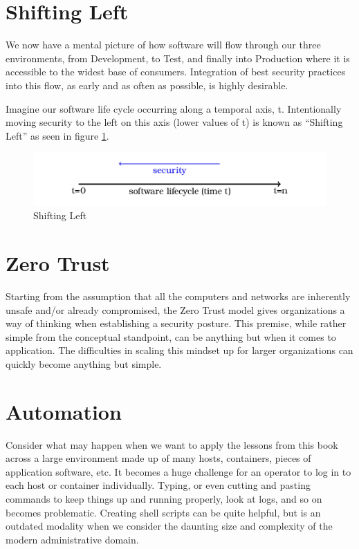 \section{Shifting Left}

\justify{}
We now have a mental picture of how software will flow through our three environments, from
Development, to Test, and finally into Production where it is accessible to the widest
base of consumers. Integration of best security practices into this flow, as early and as often
as possible, is highly desirable.

\justify{}
Imagine our software life cycle occurring along a temporal axis, t. Intentionally moving security to the
left on this axis (lower values of t) is known as ``Shifting Left'' as seen
in figure \ref{shift}.

\begin{figure}
\centering
\includegraphics{images/shift_left.png}
\caption{Shifting Left}
\label{shift}
\end{figure}

\section{Zero Trust}

\justify{}
Starting from the assumption that all the computers and networks are inherently unsafe and/or already compromised, the
Zero Trust model gives organizations a way of thinking when establishing a security posture.\cite{zerotrust} This premise,
while rather simple from the conceptual standpoint, can be anything but when it comes to application. The difficulties in
scaling this mindset up for larger organizations can quickly become anything but simple.

\section{Automation}

\justify{}
Consider what may happen when we want to apply the lessons from this book across a large environment made up of many hosts,
containers, pieces of application software, etc. It becomes a huge challenge for an operator to log in to each host or container
individually. Typing, or even cutting and pasting commands to keep things up and running properly, look at logs,
and so on becomes problematic. Creating shell scripts can be quite helpful, but is an outdated modality when we consider
the daunting size and complexity of the modern administrative domain.

